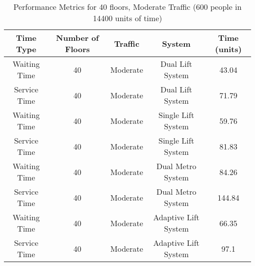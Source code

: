\documentclass[12pt,a4paper]{report}
\begin{document}
\begin{table}[H]
\centering
\begin{tabular}{|c|c|c|c|c|}
\hline
\textbf{Time Type}    & \textbf{Number of Floors} & \textbf{Traffic} & \textbf{System}     & \textbf{Time (units)} \\ \hline
Waiting Time         & 40                    & Moderate              & Dual Lift System               & 43.04           \\ \hline
Service Time         & 40                    & Moderate              & Dual Lift System               & 71.79             \\ \hline
Waiting Time         & 40                    & Moderate              & Single Lift System            & 59.76             \\ \hline
Service Time         & 40                    & Moderate              & Single Lift System            & 81.83              \\ \hline
Waiting Time         & 40                    & Moderate              & Dual Metro System  & 84.26             \\ \hline
Service Time         & 40                    & Moderate              & Dual Metro System  & 144.84              \\ \hline
Waiting Time         & 40                     & Moderate         & Adaptive Lift System           & 66.35            \\ \hline
Service Time         & 40                     & Moderate         & Adaptive Lift System           & 97.1            \\ \hline
\end{tabular}
\caption{Performance Metrics for 40 floors, Moderate Traffic (600 people in 14400 units of time)}
\end{table}
\end{document}
